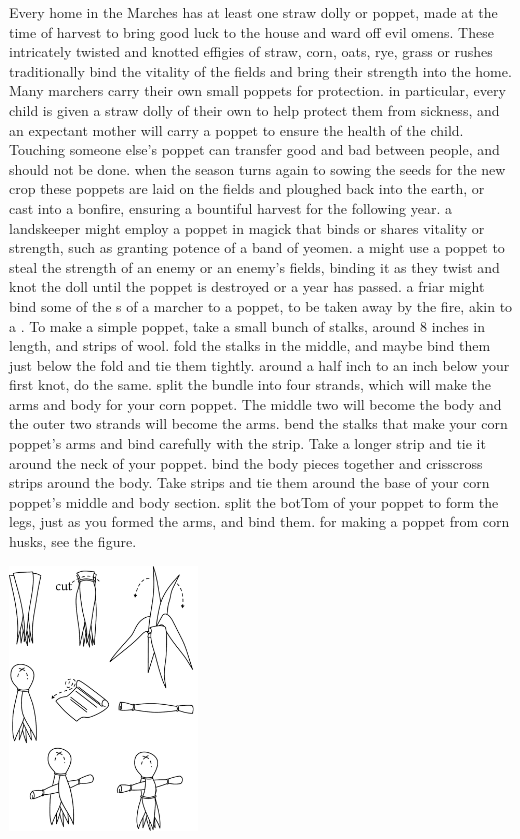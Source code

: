  Every home in the Marches has at least one straw dolly or poppet, made at the time of harvest to bring good luck to the house and ward off evil omens. These intricately twisted and knotted effigies of straw, corn, oats, rye, grass or rushes traditionally bind the vitality of the fields and bring their strength into the home. \localpar Many marchers carry their own small poppets for protection. in particular, every child is given a straw dolly of their own to help protect them from sickness, and an expectant mother will carry a poppet to ensure the health of the child. Touching someone else’s poppet can transfer good and bad between people, and should not be done. when the season turns again to sowing the seeds for the new crop these poppets are laid on the fields and ploughed back into the earth, or cast into a bonfire, ensuring a bountiful harvest for the following year. a landskeeper might employ a poppet in magick that binds or shares vitality or strength, such as granting potence of a band of yeomen. a  might use a poppet to steal the strength of an enemy or an enemy's fields, binding it as they twist and knot the doll until the poppet is destroyed or a year has passed. a friar might bind some of the s of a marcher to a poppet, to be taken away by the  fire, akin to a . \localpar To make a simple poppet, take a small bunch of stalks, around 8 inches in length, and strips of wool. fold the stalks in the middle, and maybe bind them just below the fold and tie them tightly. around a half inch to an inch below your first knot, do the same. split the bundle into four strands, which will make the arms and body for your corn poppet. The middle two will become the body and the outer two strands will become the arms. bend the stalks that make your corn poppet’s arms and bind carefully with the strip. Take a longer strip and tie it around the neck of your poppet. bind the body pieces together and crisscross strips around the body. Take strips and tie them around the base of your corn poppet’s middle and body section. split the botTom of your poppet to form the legs, just as you formed the arms, and bind them. for making a poppet from corn husks, see the figure.\begin{center}\includegraphics[width=5cm]{encyclopedia/poppet}\end{center} \bigparagraphendtwiddle
